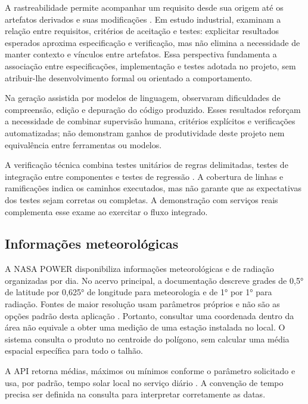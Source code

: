 A rastreabilidade permite acompanhar um requisito desde sua origem até os artefatos derivados e suas modificações \citep{GOTEL1994}. Em estudo industrial, \citet{BJARNASON2015} examinam a relação entre requisitos, critérios de aceitação e testes: explicitar resultados esperados aproxima especificação e verificação, mas não elimina a necessidade de manter contexto e vínculos entre artefatos. Essa perspectiva fundamenta a associação entre especificações, implementação e testes adotada no projeto, sem atribuir-lhe desenvolvimento formal ou orientado a comportamento.

Na geração assistida por modelos de linguagem, \citet{VAITHILINGAM2022} observaram dificuldades de compreensão, edição e depuração do código produzido. Esses resultados reforçam a necessidade de combinar supervisão humana, critérios explícitos e verificações automatizadas; não demonstram ganhos de produtividade deste projeto nem equivalência entre ferramentas ou modelos.

A verificação técnica combina testes unitários de regras delimitadas, testes de integração entre componentes e testes de regressão \citep{BENDER2020}. A cobertura de linhas e ramificações indica os caminhos executados, mas não garante que as expectativas dos testes sejam corretas ou completas. A demonstração com serviços reais complementa esse exame ao exercitar o fluxo integrado.

\subsection{Informações meteorológicas}

A NASA POWER disponibiliza informações meteorológicas e de radiação organizadas por dia. No acervo principal, a documentação descreve grades de 0,5° de latitude por 0,625° de longitude para meteorologia e de 1° por 1° para radiação. Fontes de maior resolução usam parâmetros próprios e não são as opções padrão desta aplicação \citep{NASA_POWER_METHOD}. Portanto, consultar uma coordenada dentro da área não equivale a obter uma medição de uma estação instalada no local. O sistema consulta o produto no centroide do polígono, sem calcular uma média espacial específica para todo o talhão.

A API retorna médias, máximos ou mínimos conforme o parâmetro solicitado e usa, por padrão, tempo solar local no serviço diário \citep{NASA_POWER_DAILY}. A convenção de tempo precisa ser definida na consulta para interpretar corretamente as datas.

